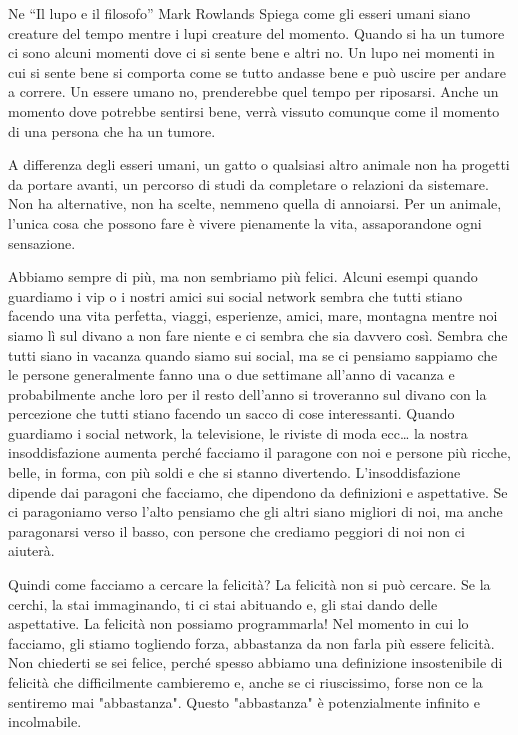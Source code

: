 \documentclass[12pt]{book} %
\begin{document}
\begin{mdframed}[linewidth=1pt]
Ne “Il lupo e il filosofo” Mark
Rowlands Spiega come gli esseri umani siano creature del tempo mentre i lupi creature del momento. Quando si ha un
tumore ci sono alcuni momenti dove ci si sente bene e altri no. Un lupo nei momenti in cui si sente bene si comporta
come se tutto andasse bene e può uscire per andare a correre. Un essere umano no, prenderebbe quel tempo per riposarsi.
Anche un momento dove potrebbe sentirsi bene, verrà vissuto comunque come il momento di una persona che ha un tumore.

A differenza degli esseri umani, un gatto o qualsiasi altro animale non ha progetti da portare avanti, un percorso di studi da completare o relazioni da sistemare. Non ha alternative, non ha scelte, nemmeno quella di annoiarsi. Per un animale, l'unica cosa che possono fare è vivere pienamente la vita, assaporandone ogni sensazione. 
\end{mdframed}

Abbiamo sempre di più, ma non sembriamo più felici. Alcuni esempi quando guardiamo i vip o i nostri amici sui
social network sembra che tutti stiano facendo una vita perfetta, viaggi, esperienze, amici, mare, montagna mentre noi
siamo lì sul divano a non fare niente e ci sembra che sia davvero così. Sembra che tutti siano in vacanza quando siamo sui social, ma se
ci pensiamo sappiamo che le persone generalmente fanno una o due settimane all'anno di vacanza e
probabilmente anche loro per il resto dell'anno si troveranno sul divano con la percezione che
tutti stiano facendo un sacco di cose interessanti. Quando guardiamo i social network, la
televisione, le riviste di moda ecc… la nostra insoddisfazione aumenta perché facciamo il paragone con noi e persone
più ricche, belle, in forma, con più soldi e che si stanno divertendo. L'insoddisfazione dipende dai paragoni che
facciamo, che dipendono da definizioni e aspettative. Se ci paragoniamo verso l'alto pensiamo che gli altri siano
migliori di noi, ma anche paragonarsi verso il basso, con persone che crediamo peggiori di noi non ci aiuterà.

Quindi come facciamo a cercare la felicità? 
La felicità non si può cercare. Se la cerchi, la stai immaginando, ti ci stai abituando e, gli stai dando delle
aspettative. La felicità non possiamo programmarla! Nel momento in cui lo facciamo, gli stiamo togliendo forza, abbastanza da non farla più essere felicità. Non chiederti se sei felice, perché spesso abbiamo una definizione insostenibile di felicità che difficilmente cambieremo e, anche se ci riuscissimo, forse non ce la sentiremo mai "abbastanza". Questo "abbastanza" è potenzialmente infinito e incolmabile. 
\end{document}
